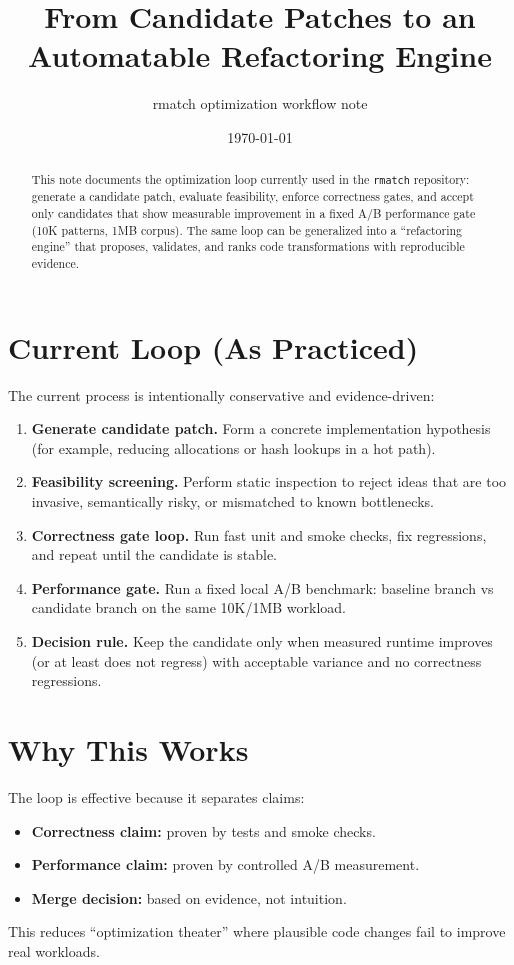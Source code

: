 \documentclass[11pt]{article}
\title{From Candidate Patches to an Automatable Refactoring Engine}
\author{rmatch optimization workflow note}
\date{\today}
\begin{document}
\maketitle

\begin{abstract}
This note documents the optimization loop currently used in the \texttt{rmatch} repository: generate a candidate patch, evaluate feasibility, enforce correctness gates, and accept only candidates that show measurable improvement in a fixed A/B performance gate (10K patterns, 1MB corpus). The same loop can be generalized into a ``refactoring engine'' that proposes, validates, and ranks code transformations with reproducible evidence.
\end{abstract}

\section{Current Loop (As Practiced)}
The current process is intentionally conservative and evidence-driven:
\begin{enumerate}
  \item \textbf{Generate candidate patch.} Form a concrete implementation hypothesis (for example, reducing allocations or hash lookups in a hot path).
  \item \textbf{Feasibility screening.} Perform static inspection to reject ideas that are too invasive, semantically risky, or mismatched to known bottlenecks.
  \item \textbf{Correctness gate loop.} Run fast unit and smoke checks, fix regressions, and repeat until the candidate is stable.
  \item \textbf{Performance gate.} Run a fixed local A/B benchmark: baseline branch vs candidate branch on the same 10K/1MB workload.
  \item \textbf{Decision rule.} Keep the candidate only when measured runtime improves (or at least does not regress) with acceptable variance and no correctness regressions.
\end{enumerate}

\section{Why This Works}
The loop is effective because it separates claims:
\begin{itemize}
  \item \textbf{Correctness claim:} proven by tests and smoke checks.
  \item \textbf{Performance claim:} proven by controlled A/B measurement.
  \item \textbf{Merge decision:} based on evidence, not intuition.
\end{itemize}
This reduces ``optimization theater'' where plausible code changes fail to improve real workloads.
\end{document}
